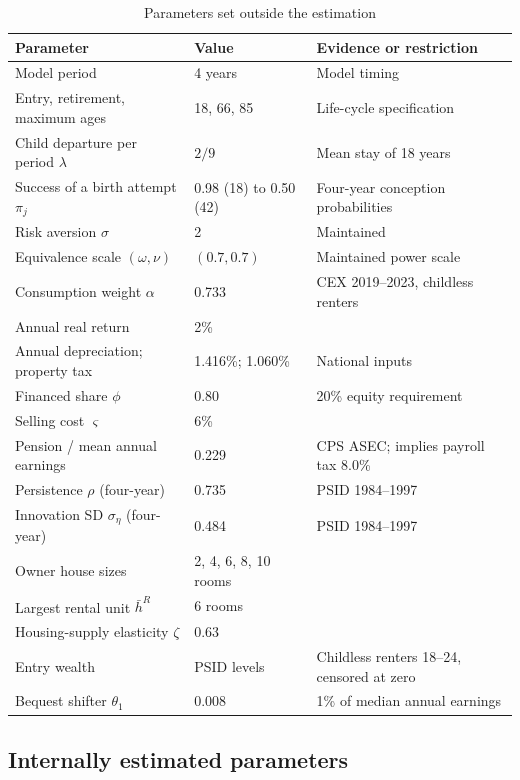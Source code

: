 \begin{table}[H]
\centering
\caption{Parameters set outside the estimation}
\label{tab:quant-assigned-oct06}
\small
\begin{tabularx}{\textwidth}{@{}X l X@{}}
\toprule
Parameter & Value & Evidence or restriction \\
\midrule
Model period & 4 years & Model timing \\
Entry, retirement, maximum ages & 18, 66, 85 & Life-cycle specification \\
Child departure per period $\lambda$ & $2/9$ & Mean stay of 18 years \\
Success of a birth attempt $\pi_j$ & 0.98 (18) to 0.50 (42) & Four-year conception probabilities \\
Risk aversion $\sigma$ & 2 & Maintained \\
Equivalence scale $(\omega,\nu)$ & $(0.7,0.7)$ & Maintained power scale \\
Consumption weight $\alpha$ & 0.733 & CEX 2019--2023, childless renters \\
Annual real return & 2\% & \citet{greaneyDynamicUrbanEconomics2025} \\
Annual depreciation; property tax & 1.416\%; 1.060\% & National inputs \\
Financed share $\phi$ & 0.80 & 20\% equity requirement \\
Selling cost $\varsigma$ & 6\% & \citet{greaneyDynamicUrbanEconomics2025} \\
Pension / mean annual earnings & 0.229 & CPS ASEC; implies payroll tax 8.0\% \\
Persistence $\rho$ (four-year) & 0.735 & PSID 1984--1997 \\
Innovation SD $\sigma_\eta$ (four-year) & 0.484 & PSID 1984--1997 \\
Owner house sizes & 2, 4, 6, 8, 10 rooms & \\
Largest rental unit $\bar h^R$ & 6 rooms & \\
Housing-supply elasticity $\zeta$ & 0.63 & \\
Entry wealth & PSID levels & Childless renters 18--24, censored at zero \\
Bequest shifter $\theta_1$ & 0.008 & 1\% of median annual earnings \\
\bottomrule
\end{tabularx}
\end{table}

\subsection{Internally estimated parameters}

